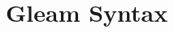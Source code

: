 \documentclass[10pt,landscape,a4paper]{article}
\begin{document}
\pagestyle{fancy}

\section*{\LARGE \rmfamily
          Gleam {\mdseries Syntax }}

\begin{multicols*}{3}
  




\end{multicols*}
\end{document}
